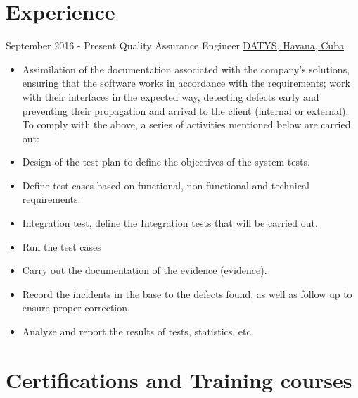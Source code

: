 \documentclass[letterpaper]{twentysecondcv} %
\begin{document}
\makeprofile %
 

\section{Experience}

\begin{twenty} %
\twentyitem
    	{September 2016 -}
		{Present}
        {Quality Assurance Engineer}
        {\href{http://datys.cu/}{DATYS, Havana, Cuba}}
        {}
        {
        {\begin{itemize}
        \item Assimilation of the documentation associated with the company's solutions, ensuring that the software works in accordance with the requirements; work with their interfaces in the expected way, detecting defects early and preventing their propagation and arrival to the client (internal or external). To comply with the above, a series of activities mentioned below are carried out:
\item Design of the test plan to define the objectives of the system tests.
\item Define test cases based on functional, non-functional and technical requirements.
\item Integration test, define the Integration tests that will be carried out.
\item Run the test cases
\item Carry out the documentation of the evidence (evidence).
\item Record the incidents in the base to the defects found, as well as follow up to ensure proper correction.
\item Analyze and report the results of tests, statistics, etc.
        \end{itemize}}
        }
        
\end{twenty}

\section{Certifications and Training courses}
\end{document}
